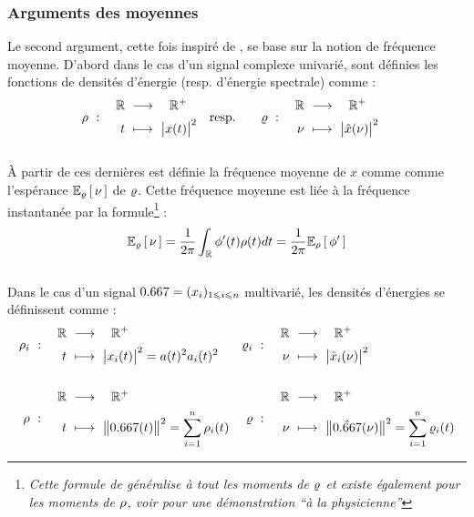 \subsubsection*{Arguments des moyennes}

Le second argument, cette fois inspiré de \cite{cano_mathematical_2022}, se base sur la notion de fréquence moyenne.
D'abord dans le cas d'un signal complexe univarié, sont définies les fonctions de densités d'énergie (resp. d'énergie spectrale) comme :
\begin{align}\label{eq:densi_dE}
	\densit\ &:\quad \begin{aligned}\R\ &\lr\quad \R^+ \\ t\ &\longmapsto\ \big|x(t)\big|^2 \end{aligned}  
	&
	\text{resp.}\qquad \densis\ &:\quad \begin{aligned}\R\ &\lr\quad \R^+ \\ \nu\ &\longmapsto\ \big|\fou{x}(\nu)\big|^2 \end{aligned}
\end{align}
\\
À partir de ces dernières est définie la fréquence moyenne de $x$ comme comme l'espérance $\esp[\densis]{\nu}$ de $\densis$. Cette fréquence moyenne est liée à la fréquence instantanée par la formule\footnote{\itshape
	Cette formule de généralise à tout les moments de $\densis$ et existe également pour les moments de $\densit$, voir \cite[sec. 1.4]{cohen_time_1995} pour une démonstration ``à la physicienne''
} :
\begin{equation}\label{eq:esp_freq}
	\esp[\densis]{\nu} = \frac{1}{2\pi}\int_\R \phi'(t)\densit(t)dt = \frac{1}{2\pi} \esp[\densit]{\phi'}
\end{equation}
\\
Dans le cas d'un signal $\x=(x_i)_{1\leq i\leq n}$ multivarié, les densités d'énergies se définissent comme :
\begin{align*}%
	\densit_i\ &:\quad \begin{aligned}\R\ &\lr\quad \R^+ \\ t\ &\longmapsto\ \big|x_i(t)\big|^2 = a(t)^2 a_i(t)^2 \end{aligned}  
	&
	\densis_i\ &:\quad \begin{aligned}\R\ &\lr\quad \R^+ \\ \nu\ &\longmapsto\ \big|\fou{x}_i(\nu)\big|^2 \end{aligned} \\ \\
	\densit\ &:\quad \begin{aligned}\R\ &\lr\quad \R^+ \\ t\ &\longmapsto\ \big\|\x(t)\big\|^2 = \sum_{i=1}^n \densit_i(t) \end{aligned}  
	&
	\densis\ &:\quad \begin{aligned}\R\ &\lr\quad \R^+ \\ \nu\ &\longmapsto\ \big\|\fou{\x}(\nu)\big\|^2 = \sum_{i=1}^n \densis_i(t) \end{aligned}	
\end{align*}
